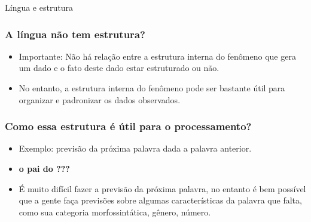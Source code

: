 \documentclass[11pt]{beamer}
\begin{document}
\begin{frame}
\begin{center}
	Língua e estrutura
\end{center}
\end{frame}
\begin{frame}
\frametitle{A língua não tem estrutura?}
\begin{itemize}
	\item Importante: Não há relação entre a estrutura interna do fenômeno que gera um dado e o fato deste dado estar estruturado ou não.\\
	\item No entanto, a estrutura interna do fenômeno pode ser bastante útil para organizar e padronizar os dados observados.\\
\end{itemize}
\end{frame}
\begin{frame}
\frametitle{Como essa estrutura é útil para o processamento?}
\begin{itemize}
	\item Exemplo: previsão da próxima palavra dada a palavra anterior.\\
	\item  \textbf{o pai do ???\\}
	\item É muito difícil fazer a previsão da próxima palavra, no entanto é bem possível que a gente faça previsões sobre algumas características da palavra que falta, como sua categoria morfossintática, gênero, número.\\
	
\end{itemize}
\end{frame}
\end{document}

